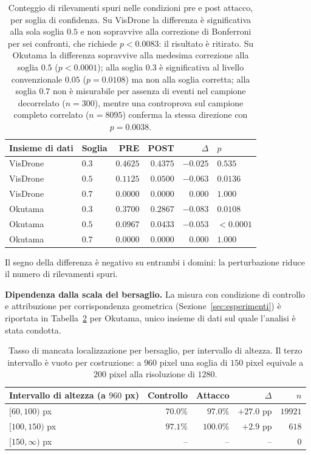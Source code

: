 \documentclass[a4paper,12pt]{report}
\begin{document}
\begin{table}[t]
\centering
\begin{tabular}{llrrrl}
\toprule
Insieme di dati & Soglia & PRE & POST & $\Delta$ & $p$ \\
\midrule
VisDrone & $0.3$ & $0.4625$ & $0.4375$ & $-0.025$ & $0.535$ \\
VisDrone & $0.5$ & $0.1125$ & $0.0500$ & $-0.063$ & $0.0136$ \\
VisDrone & $0.7$ & $0.0000$ & $0.0000$ & $0.000$ & $1.000$ \\
\addlinespace
Okutama & $0.3$ & $0.3700$ & $0.2867$ & $-0.083$ & $0.0108$ \\
Okutama & $0.5$ & $0.0967$ & $0.0433$ & $-0.053$ & $<0.0001$ \\
Okutama & $0.7$ & $0.0000$ & $0.0000$ & $0.000$ & $1.000$ \\
\bottomrule
\end{tabular}
\caption{Conteggio di rilevamenti spuri nelle condizioni pre e post attacco, per soglia di confidenza. Su VisDrone la differenza è significativa alla sola soglia $0.5$ e non sopravvive alla correzione di Bonferroni per sei confronti, che richiede $p < 0.0083$: il risultato è ritirato. Su Okutama la differenza sopravvive alla medesima correzione alla soglia $0.5$ ($p < 0.0001$); alla soglia $0.3$ è significativa al livello convenzionale $0.05$ ($p = 0.0108$) ma non alla soglia corretta; alla soglia $0.7$ non è misurabile per assenza di eventi nel campione decorrelato ($n = 300$), mentre una controprova sul campione completo correlato ($n = 8095$) conferma la stessa direzione con $p = 0.0038$.}
\label{tab:collaterale}
\end{table}

Il segno della differenza è negativo su entrambi i domini: la perturbazione riduce il numero di rilevamenti spuri.

\textbf{Dipendenza dalla scala del bersaglio.}
\label{sec:risultato_stratificazione}
La misura con condizione di controllo e attribuzione per corrispondenza geometrica (Sezione~\ref{sec:esperimenti}) è riportata in Tabella~\ref{tab:stratificazione} per Okutama, unico insieme di dati sul quale l'analisi è stata condotta.

\begin{table}[t]
\centering
\begin{tabular}{lrrrr}
\toprule
Intervallo di altezza (a $960$ px) & Controllo & Attacco & $\Delta$ & $n$ \\
\midrule
$[60, 100)$ px & $70.0\%$ & $97.0\%$ & $+27.0$ pp & $19921$ \\
$[100, 150)$ px & $97.1\%$ & $100.0\%$ & $+2.9$ pp & $618$ \\
$[150, \infty)$ px & -- & -- & -- & $0$ \\
\bottomrule
\end{tabular}
\caption{Tasso di mancata localizzazione per bersaglio, per intervallo di altezza. Il terzo intervallo è vuoto per costruzione: a $960$ pixel una soglia di $150$ pixel equivale a $200$ pixel alla risoluzione di $1280$.}
\label{tab:stratificazione}
\end{table}
\end{document}
